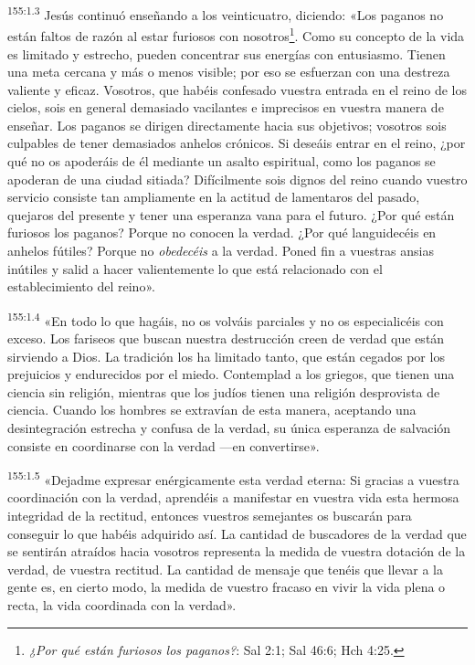 \par 
\textsuperscript{155:1.3} Jesús continuó enseñando a los veinticuatro, diciendo: «Los paganos no están faltos de razón al estar furiosos con nosotros\footnote{\textit{¿Por qué están furiosos los paganos?}: Sal 2:1; Sal 46:6; Hch 4:25.}. Como su concepto de la vida es limitado y estrecho, pueden concentrar sus energías con entusiasmo. Tienen una meta cercana y más o menos visible; por eso se esfuerzan con una destreza valiente y eficaz. Vosotros, que habéis confesado vuestra entrada en el reino de los cielos, sois en general demasiado vacilantes e imprecisos en vuestra manera de enseñar. Los paganos se dirigen directamente hacia sus objetivos; vosotros sois culpables de tener demasiados anhelos crónicos. Si deseáis entrar en el reino, ¿por qué no os apoderáis de él mediante un asalto espiritual, como los paganos se apoderan de una ciudad sitiada? Difícilmente sois dignos del reino cuando vuestro servicio consiste tan ampliamente en la actitud de lamentaros del pasado, quejaros del presente y tener una esperanza vana para el futuro. ¿Por qué están furiosos los paganos? Porque no conocen la verdad. ¿Por qué languidecéis en anhelos fútiles? Porque no \textit{obedecéis} a la verdad. Poned fin a vuestras ansias inútiles y salid a hacer valientemente lo que está relacionado con el establecimiento del reino».

\par 
\textsuperscript{155:1.4} «En todo lo que hagáis, no os volváis parciales y no os especialicéis con exceso. Los fariseos que buscan nuestra destrucción creen de verdad que están sirviendo a Dios. La tradición los ha limitado tanto, que están cegados por los prejuicios y endurecidos por el miedo. Contemplad a los griegos, que tienen una ciencia sin religión, mientras que los judíos tienen una religión desprovista de ciencia. Cuando los hombres se extravían de esta manera, aceptando una desintegración estrecha y confusa de la verdad, su única esperanza de salvación consiste en coordinarse con la verdad ---en convertirse».

\par 
\textsuperscript{155:1.5} «Dejadme expresar enérgicamente esta verdad eterna: Si gracias a vuestra coordinación con la verdad, aprendéis a manifestar en vuestra vida esta hermosa integridad de la rectitud, entonces vuestros semejantes os buscarán para conseguir lo que habéis adquirido así. La cantidad de buscadores de la verdad que se sentirán atraídos hacia vosotros representa la medida de vuestra dotación de la verdad, de vuestra rectitud. La cantidad de mensaje que tenéis que llevar a la gente es, en cierto modo, la medida de vuestro fracaso en vivir la vida plena o recta, la vida coordinada con la verdad».

